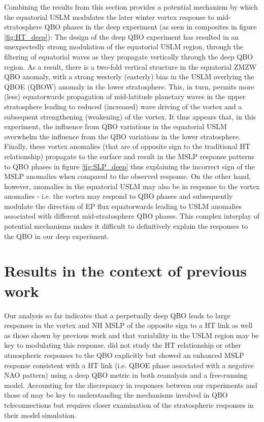 Combining the results from this section provides a potential mechanism by which the equatorial USLM modulates the later winter vortex response to mid-stratosphere QBO phases in the deep experiment (as seen in composites in figure \ref{fig:HT_deep}): The design of the deep QBO experiment has resulted in an unexpectedly strong modulation of the equatorial USLM region, through the filtering of equatorial waves as they propagate vertically through the deep QBO region. As a result, there is a two-fold vertical structure in the equatorial ZMZW QBO anomaly, with a strong westerly (easterly) bias in the USLM overlying the QBOE (QBOW) anomaly in the lower stratosphere. This, in turn, permits more (less) equatorwards propagation of mid-latitude planetary waves in the upper stratosphere leading to reduced (increased) wave driving of the vortex and a subsequent strengthening (weakening) of the vortex. It thus appears that, in this experiment, the influence from QBO variations in the equatorial USLM overwhelm the influence from the QBO variations in the lower stratosphere.  Finally, these vortex anomalies (that are of opposite sign to the traditional HT relationship) propagate to the surface and result in the MSLP response patterns to QBO phases in figure \ref{fig:SLP_deep} thus explaining the incorrect sign of the MSLP anomalies when compared to the observed response. On the other hand, however, anomalies in the equatorial USLM may also be in response to the vortex anomalies - i.e. the vortex may respond to QBO phases and subsequently modulate the direction of EP flux equatorwards leading to USLM anomalies associated with different mid-stratosphere QBO phases. This complex interplay of potential mechanisms makes it difficult to definitively explain the responses to the QBO in our deep experiment. 

\section{Results in the context of previous work}
Our analysis so far indicates that a perpetually deep QBO leads to large responses in the vortex and NH MSLP of the opposite sign to a HT link as well as those shown by previous work \citep{andrewsObserved2019d} and that variability in the USLM region may be key to modulating this response. \cite{andrewsObserved2019d} did not study the HT relationship or other atmospheric responses to the QBO explicitly but showed an enhanced MSLP response consistent with a HT link (i.e. QBOE phase associated with a negative NAO pattern) using a deep QBO metric in both reanalysis and a free-running model. Accounting for the discrepancy in responses between our experiments and those of \cite{andrewsObserved2019d} may be key to understanding the mechanisms involved in QBO teleconnections but requires closer examination of the stratospheric responses in their model simulation.

